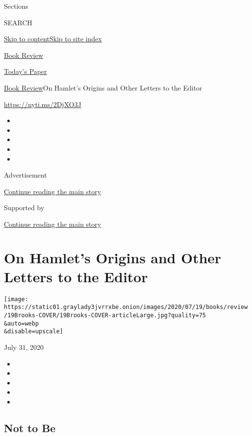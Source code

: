 Sections

SEARCH

\protect\hyperlink{site-content}{Skip to
content}\protect\hyperlink{site-index}{Skip to site index}

\href{https://www.nytimes3xbfgragh.onion/section/books/review}{Book
Review}

\href{https://myaccount.nytimes3xbfgragh.onion/auth/login?response_type=cookie\&client_id=vi}{}

\href{https://www.nytimes3xbfgragh.onion/section/todayspaper}{Today's
Paper}

\href{/section/books/review}{Book Review}\textbar{}On Hamlet's Origins
and Other Letters to the Editor

\url{https://nyti.ms/2DjXO3J}

\begin{itemize}
\item
\item
\item
\item
\item
\end{itemize}

Advertisement

\protect\hyperlink{after-top}{Continue reading the main story}

Supported by

\protect\hyperlink{after-sponsor}{Continue reading the main story}

\hypertarget{on-hamlets-origins-and-other-letters-to-the-editor}{%
\section{On Hamlet's Origins and Other Letters to the
Editor}\label{on-hamlets-origins-and-other-letters-to-the-editor}}

\texttt{[image: https://static01.graylady3jvrrxbe.onion/images/2020/07/19/books/review/19Brooks-COVER/19Brooks-COVER-articleLarge.jpg?quality=75\\\&auto=webp\\\&disable=upscale]}

July 31, 2020

\begin{itemize}
\item
\item
\item
\item
\item
\end{itemize}

\hypertarget{not-to-be}{%
\subsection{Not to Be}\label{not-to-be}}

